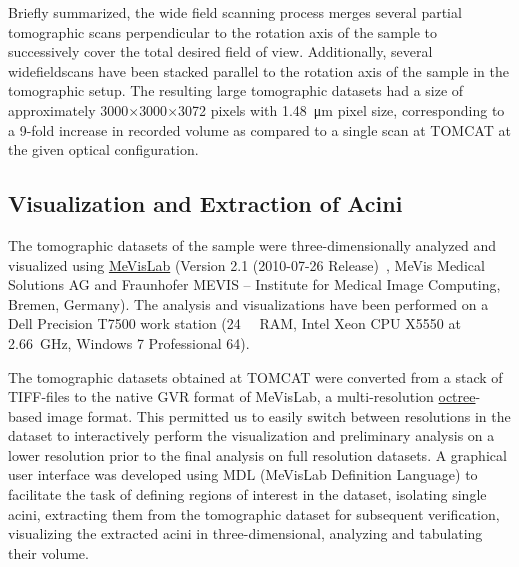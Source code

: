 \documentclass[%
	twoside,
	paper=a4,%
	abstract=true,%
	]{scrartcl}
\begin{document}
Briefly summarized, the wide field scanning process merges several partial tomographic scans perpendicular to the rotation axis of the sample to successively cover the total desired field of view. Additionally, several widefieldscans have been stacked parallel to the rotation axis of the sample in the tomographic setup. The resulting large tomographic datasets had a size of approximately 3000\(\times\)3000\(\times\)3072 pixels with \SI{1.48}{\micro\meter} pixel size, corresponding to a 9-fold increase in recorded volume as compared to a single scan at TOMCAT at the given optical configuration.

\subsection{Visualization and Extraction of Acini}
The tomographic datasets of the sample were three-dimensionally analyzed and visualized using \href{http://mevislab.de}{MeVisLab} (Version 2.1 (2010-07-26 Release)~\cite{Bitter2007}, MeVis Medical Solutions AG and Fraunhofer MEVIS -- Institute for Medical Image Computing, Bremen, Germany). The analysis and visualizations have been performed on a Dell Precision T7500 work station (\SI{24}{\giga\byte} RAM, Intel Xeon CPU X5550 at \SI{2.66}{\giga\hertz}, Windows 7 Professional \SI{64}{\bit}). 

The tomographic datasets obtained at TOMCAT were converted from a stack of TIFF-files to the native GVR format of MeVisLab, a multi-resolution \href{https://secure.wikimedia.org/wikipedia/en/w/index.php?title=Octree&oldid=409131920}{octree}-based image format. This permitted us to easily switch between resolutions in the dataset to interactively perform the visualization and preliminary analysis on a lower resolution prior to the final analysis on full resolution datasets. A graphical user interface was developed using MDL (MeVisLab Definition Language) to facilitate the task of defining regions of interest in the dataset, isolating single acini, extracting them from the tomographic dataset for subsequent verification, visualizing the extracted acini in three-dimensional, analyzing and tabulating their volume.
\end{document}
